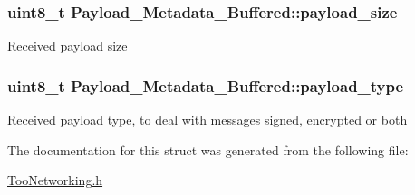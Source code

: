 \subsubsection[{\texorpdfstring{payload\+\_\+size}{payload_size}}]{\setlength{\rightskip}{0pt plus 5cm}uint8\+\_\+t Payload\+\_\+\+Metadata\+\_\+\+Buffered\+::payload\+\_\+size}\hypertarget{structPayload__Metadata__Buffered_ac422a1798dc5be1d2000ef6be0f00db3}{}\label{structPayload__Metadata__Buffered_ac422a1798dc5be1d2000ef6be0f00db3}
Received payload size 
\subsubsection[{\texorpdfstring{payload\+\_\+type}{payload_type}}]{\setlength{\rightskip}{0pt plus 5cm}uint8\+\_\+t Payload\+\_\+\+Metadata\+\_\+\+Buffered\+::payload\+\_\+type}\hypertarget{structPayload__Metadata__Buffered_a662a18fe5f3e5a48117259f1e94bed39}{}\label{structPayload__Metadata__Buffered_a662a18fe5f3e5a48117259f1e94bed39}
Received payload type, to deal with messages signed, encrypted or both 

The documentation for this struct was generated from the following file\+:\begin{DoxyCompactItemize}
\item 
\hyperlink{TooNetworking_8h}{Too\+Networking.\+h}\end{DoxyCompactItemize}
